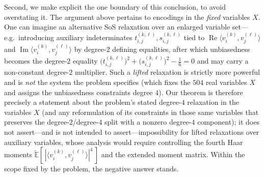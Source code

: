 \documentclass{amsart}
\theoremstyle{definition}
\theoremstyle{remark}
\begin{document}
Second, we make explicit the one boundary of this conclusion, to avoid overstating it. The
argument above pertains to encodings in the \emph{fixed} variables $X$. One can imagine an
alternative SoS relaxation over an enlarged variable set---e.g.\ introducing auxiliary
indeterminates $t^{(k,\ell)}_{i,j},s^{(k,\ell)}_{i,j}$ tied to
$\operatorname{Re}\langle v^{(k)}_i,v^{(\ell)}_j\rangle$ and
$\operatorname{Im}\langle v^{(k)}_i,v^{(\ell)}_j\rangle$ by degree-$2$ defining equalities, after
which unbiasedness becomes the degree-$2$ equality $\bigl(t^{(k,\ell)}_{i,j}\bigr)^2
+\bigl(s^{(k,\ell)}_{i,j}\bigr)^2-\tfrac16=0$ and may carry a non-constant degree-$2$
multiplier. Such a \emph{lifted} relaxation is strictly more powerful and is \emph{not} the
system the problem specifies (which fixes the $504$ real variables $X$ and assigns the
unbiasedness constraints degree $4$). Our theorem is therefore precisely a statement about the
problem's stated degree-$4$ relaxation in the variables $X$ (and any reformulation of its
constraints in those same variables that preserves the degree-$2$/degree-$4$ split with a
nonzero degree-$4$ component); it does not assert---and is not intended to assert---impossibility
for lifted relaxations over auxiliary variables, whose analysis would require controlling the
fourth Haar moments $\widetilde{\mathbb{E}}[\,|\langle v^{(k)}_i,v^{(\ell)}_j\rangle|^4\,]$ and
the extended moment matrix. Within the scope fixed by the problem, the negative answer stands.
\end{document}
